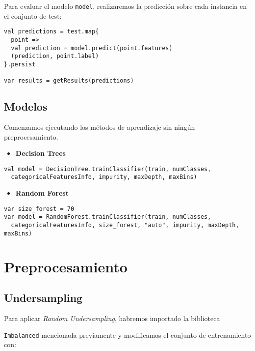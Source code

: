 \documentclass[11pt]{article}
\begin{document}
Para evaluar el modelo \texttt{model}, realizaremos la predicción sobre cada
instancia en el conjunto de test:

\begin{verbatim}
val predictions = test.map{
  point =>
  val prediction = model.predict(point.features)
  (prediction, point.label)
}.persist

var results = getResults(predictions)
\end{verbatim}
\subsection{Modelos}
\label{sec:orgff64da0}

Comenzamos ejecutando los métodos de aprendizaje sin ningún
preprocesamiento.

\begin{itemize}
\item \textbf{Decision Trees}
\end{itemize}
\begin{verbatim}
val model = DecisionTree.trainClassifier(train, numClasses,
  categoricalFeaturesInfo, impurity, maxDepth, maxBins)
\end{verbatim}

\begin{itemize}
\item \textbf{Random Forest}
\end{itemize}
\begin{verbatim}
var size_forest = 70
var model = RandomForest.trainClassifier(train, numClasses,
  categoricalFeaturesInfo, size_forest, "auto", impurity, maxDepth, maxBins)
\end{verbatim}

\section{Preprocesamiento}
\label{sec:org40b2bd7}

\subsection{Undersampling}
\label{sec:org3132c15}

Para aplicar \emph{Random Undersampling}, habremos importado la biblioteca 

\texttt{Imbalanced} mencionada previamente y modificamos el conjunto de
entrenamiento con:
\end{document}
